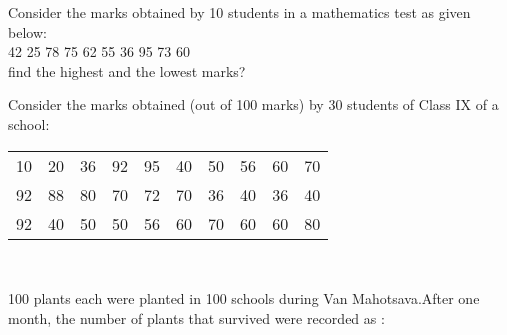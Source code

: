 \item Consider the marks obtained by 10 students in a mathematics test as given below:\\
42 25 78 75 62 55 36 95 73 60\\
find the highest and the lowest marks?\\
\item Consider the marks obtained (out of 100 marks) by 30 students of Class IX of a school:\\

\begin{tabular}{cccccccccc}
10 &20 &36 &92 &95 &40 &50 &56 &60 &70\\
92 &88 &80 &70 &72 &70 &36 &40 &36 &40\\
92 &40 &50 &50 &56 &60 &70 &60 &60 &80\\
\end{tabular}\\

\item 100 plants each were planted in 100 schools during Van Mahotsava.After one month, the number of plants that survived were recorded as :\\

